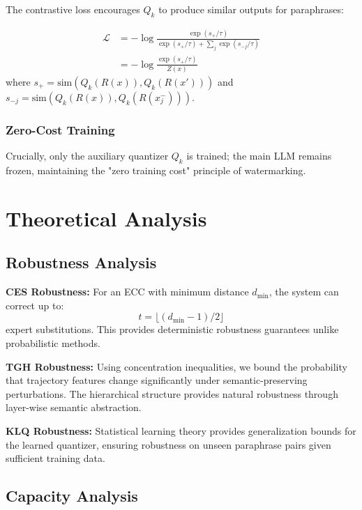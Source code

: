 The contrastive loss encourages $Q_k$ to produce similar outputs for paraphrases:

\begin{align}
\mathcal{L} &= -\log \frac{\exp(s_{+}/\tau)}{\exp(s_{+}/\tau) + \sum_j \exp(s_{-j}/\tau)} \nonumber \\
&= -\log \frac{\exp(s_{+}/\tau)}{Z(x)} \label{eq:contrastive_loss}
\end{align}
where $s_{+} = \text{sim}(Q_k(R(x)), Q_k(R(x')))$ and $s_{-j} = \text{sim}(Q_k(R(x)), Q_k(R(x_j^-)))$.

\subsubsection{Zero-Cost Training}

Crucially, only the auxiliary quantizer $Q_k$ is trained; the main LLM remains frozen, maintaining the "zero training cost" principle of watermarking.

\section{Theoretical Analysis}

\subsection{Robustness Analysis}

\textbf{CES Robustness:} For an ECC with minimum distance $d_{\min}$, the system can correct up to:
\begin{equation}
t = \lfloor(d_{\min}-1)/2\rfloor
\end{equation}
expert substitutions. This provides deterministic robustness guarantees unlike probabilistic methods.

\textbf{TGH Robustness:} Using concentration inequalities, we bound the probability that trajectory features change significantly under semantic-preserving perturbations. The hierarchical structure provides natural robustness through layer-wise semantic abstraction.

\textbf{KLQ Robustness:} Statistical learning theory provides generalization bounds for the learned quantizer, ensuring robustness on unseen paraphrase pairs given sufficient training data.

\subsection{Capacity Analysis}

